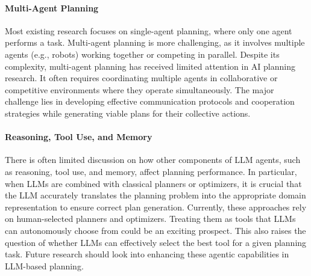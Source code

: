 \vspace{-0.07in}
\paragraph{Multi-Agent Planning} Most existing research focuses on single-agent planning, where only one agent performs a task. Multi-agent planning \cite{konolige1980multiple, torreno2017cooperative} is more challenging, as it involves multiple agents (e.g., robots) working together or competing in parallel. Despite its complexity, multi-agent planning has received limited attention in AI planning research. It often requires coordinating multiple agents in collaborative or competitive environments where they operate simultaneously. The major challenge lies in developing effective communication protocols and cooperation strategies while generating viable plans for their collective actions.

\vspace{-0.07in}
\paragraph{Reasoning, Tool Use, and Memory}\quad There is often limited discussion on how other components of LLM agents, such as reasoning, tool use, and memory, affect planning performance. In particular, when LLMs are combined with classical planners or optimizers, it is crucial that the LLM accurately translates the planning problem into the appropriate domain representation to ensure correct plan generation. Currently, these approaches rely on human-selected planners and optimizers. Treating them as tools that LLMs can autonomously choose from could be an exciting prospect. This also raises the question of whether LLMs can effectively select the best tool for a given planning task. Future research should look into enhancing these agentic capabilities in LLM-based planning.





